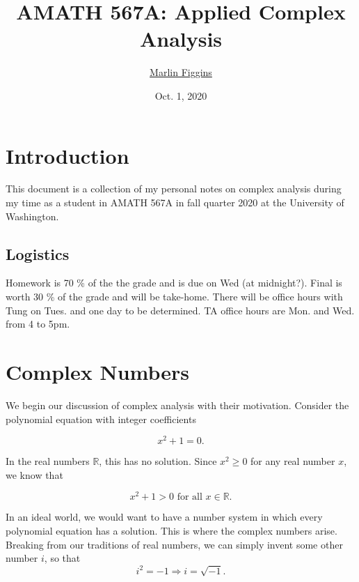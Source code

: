 \documentclass[12pt]{article}
\title{\bfseries\huge{AMATH 567A: Applied Complex Analysis}\vspace{-1ex}} \author{\href{marlinfiggins@gmail.com}{\Large{Marlin Figgins}}\vspace{-2ex}}
\date{\large{Oct. 1, 2020}}
\newcommand{\bbR}{\mathbb{R}}
\theoremstyle{definition}
\theoremstyle{remark}
\numberwithin{equation}{section}
\begin{document}
\maketitle

	\section*{\hfill Introduction \hfill}

  This document is a collection of my personal notes on complex analysis during my time as a student in AMATH 567A in fall quarter 2020 at the University of Washington.

  \subsection*{Logistics}%
  \label{sub:logistics}
  
  Homework is 70 \% of the the grade and is due on Wed (at midnight?). Final is worth 30 \% of the grade and will be take-home. There will be office hours with Tung on Tues. and one day to be determined. TA office hours are Mon. and Wed. from 4 to 5pm.  

  \thispagestyle{empty}

  \newpage
  \tableofcontents
  \thispagestyle{empty}
  \newpage

  \setcounter{page}{1}



  \section{Complex Numbers}
  \label{sec:complex_numbers}

We begin our discussion of complex analysis with their motivation. Consider the polynomial equation with integer coefficients

\begin{equation}
  x^2 + 1 = 0. %
\end{equation}

In the real numbers $\bbR$, this has no solution. Since $x^2 \geq 0$ for any real number $x$, we know that

\begin{equation*}
x^2 + 1 > 0 \text{ for all } x\in \bbR.
\end{equation*}

In an ideal world, we would want to have a number system in which every polynomial equation has a solution. This is where the complex numbers arise. Breaking from our traditions of real numbers, we can simply invent some other number $i$, so that
\begin{equation*}
  i^2 = -1 \Rightarrow i = \sqrt{-1}.
\end{equation*}
\end{document}
